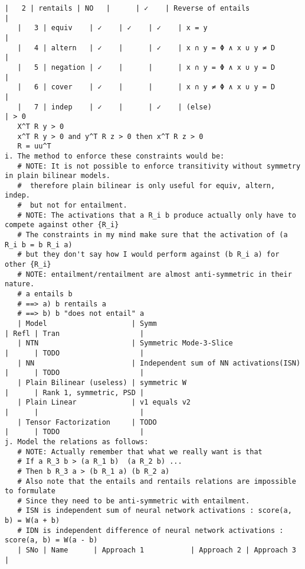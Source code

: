 \documentclass[12pt,answers]{exam} %
\begin{document}
{\begin{Verbatim}[fontsize=\small]
   |   2 | rentails | NO   |      | ✓    | Reverse of entails                                                   |
   |   3 | equiv    | ✓    | ✓    | ✓    | x = y                                                                |
   |   4 | altern   | ✓    |      | ✓    | x ∩ y = Φ ∧ x ∪ y ≠ D                                                |
   |   5 | negation | ✓    |      |      | x ∩ y = Φ ∧ x ∪ y = D                                                |
   |   6 | cover    | ✓    |      |      | x ∩ y ≠ Φ ∧ x ∪ y = D                                                |
   |   7 | indep    | ✓    |      | ✓    | (else)                                                               | > 0
   X^T R y > 0
   x^T R y > 0 and y^T R z > 0 then x^T R z > 0
   R = uu^T
i. The method to enforce these constraints would be:
   # NOTE: It is not possible to enforce transitivity without symmetry in plain bilinear models.
   #  therefore plain bilinear is only useful for equiv, altern, indep.
   #  but not for entailment.
   # NOTE: The activations that a R_i b produce actually only have to compete against other {R_i}
   # The constraints in my mind make sure that the activation of (a R_i b = b R_i a)
   # but they don't say how I would perform against (b R_i a) for other {R_i}
   # NOTE: entailment/rentailment are almost anti-symmetric in their nature.
   # a entails b
   # ==> a) b rentails a
   # ==> b) b "does not entail" a
   | Model                    | Symm                                   | Refl | Tran                   |
   | NTN                      | Symmetric Mode-3-Slice                 |      | TODO                   |
   | NN                       | Independent sum of NN activations(ISN) |      | TODO                   |
   | Plain Bilinear (useless) | symmetric W                            |      | Rank 1, symmetric, PSD |
   | Plain Linear             | v1 equals v2                           |      |                        |
   | Tensor Factorization     | TODO                                   |      | TODO                   |
j. Model the relations as follows:
   # NOTE: Actually remember that what we really want is that
   # If a R_3 b > (a R_1 b)  (a R_2 b) ...
   # Then b R_3 a > (b R_1 a) (b R_2 a)
   # Also note that the entails and rentails relations are impossible to formulate
   # Since they need to be anti-symmetric with entailment.
   # ISN is independent sum of neural network activations : score(a, b) = W(a + b)
   # IDN is independent difference of neural network activations : score(a, b) = W(a - b)
   | SNo | Name      | Approach 1           | Approach 2 | Approach 3                      |

\end{Verbatim}}
\end{document}
